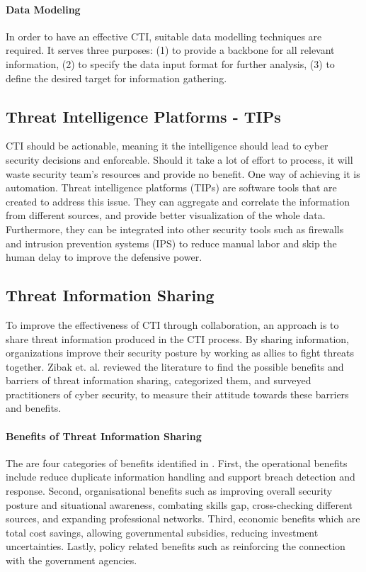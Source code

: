 \documentclass{article}
\begin{document}
\paragraph{Data Modeling}
In order to have an effective CTI, suitable data modelling techniques are required. It serves three purposes: (1) to provide a backbone for all relevant information, (2) to specify the data input format for further analysis, (3) to define the desired target for information gathering. \cite{husak_crusoe_2022}

\subsection{Threat Intelligence Platforms - TIPs}
CTI should be actionable, meaning it the intelligence should lead to cyber security decisions and enforcable. Should it take a lot of effort to process, it will waste security team's resources and provide no benefit. One way of achieving it is automation. Threat intelligence platforms (TIPs) are software tools that are created to address this issue. They can aggregate and correlate the information from different sources, and provide better visualization of the whole data. Furthermore, they can be integrated into other security tools such as firewalls and intrusion prevention systems (IPS) to reduce manual labor and skip the human delay to improve the defensive power.



\subsection{Threat Information Sharing} \label{sec:ccti}

To improve the effectiveness of CTI through collaboration, an approach is to share threat information produced in the CTI process. By sharing information, organizations improve their security posture by working as allies to fight threats together. Zibak et. al. \cite{zibak_cyber_2019} reviewed the literature to find the possible benefits and barriers of threat information sharing, categorized them, and surveyed practitioners of cyber security, to measure their attitude towards these barriers and benefits.

\paragraph*{Benefits of Threat Information Sharing}
The are four categories of benefits identified in \cite{zibak_cyber_2019}. First, the operational benefits include reduce duplicate information handling and support breach detection and response. Second, organisational benefits such as improving overall security posture and situational awareness, combating skills gap, cross-checking different sources, and expanding professional networks. Third, economic benefits which are total cost savings, allowing governmental subsidies, reducing investment uncertainties. Lastly, policy related benefits such as reinforcing the connection with the government agencies.
\end{document}
